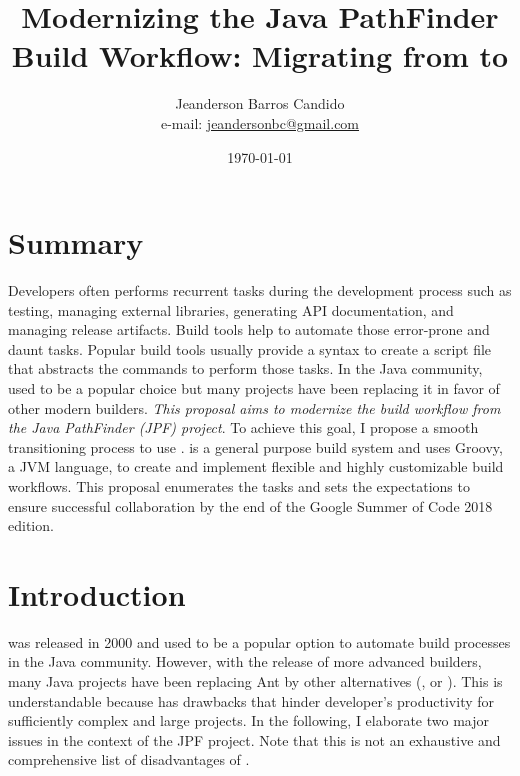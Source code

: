 \documentclass{article}
\author{Jeanderson Barros Candido\\e-mail: \url{jeandersonbc@gmail.com}}
\title{Modernizing the Java PathFinder Build Workflow: Migrating from \ant{} to
\gradle{}}
\date{\today}
\begin{document}
\maketitle

\section*{Summary}

Developers often performs recurrent tasks during the development process such
as testing, managing external libraries, generating API documentation, and
managing release artifacts.
Build tools help to automate those error-prone and daunt tasks.
Popular build tools usually provide a syntax to create a script file that
abstracts the commands to perform those tasks.
In the Java community, \ant{} used to be a popular choice but many
projects have been replacing it in favor of other modern builders.
\emph{This proposal aims to modernize the build workflow from the Java
PathFinder (JPF) project}.
To achieve this goal, I propose a smooth transitioning process to use
\gradle{}.
\gradle{} is a general purpose build system and uses Groovy, a JVM language, to
create and implement flexible and highly customizable build workflows.
This proposal enumerates the tasks and sets the expectations to ensure
successful collaboration by the end of the Google Summer of Code 2018 edition.

\section{Introduction}
\label{sec:intro}

\ant{}\cite{page:ant} was released in 2000 and used to be a popular option to
automate build processes in the Java community.
However, with the release of more advanced builders, many Java projects have
been replacing Ant by other alternatives (\eg, \gradle{}\cite{page:gradle} or
\maven{}\cite{page:maven}).
This is understandable because \ant{} has drawbacks that hinder developer's
productivity for sufficiently complex and large projects.
In the following, I elaborate two major issues in the context of the JPF
project.
Note that this is not an exhaustive and comprehensive list of disadvantages of
\ant{}.
\end{document}
